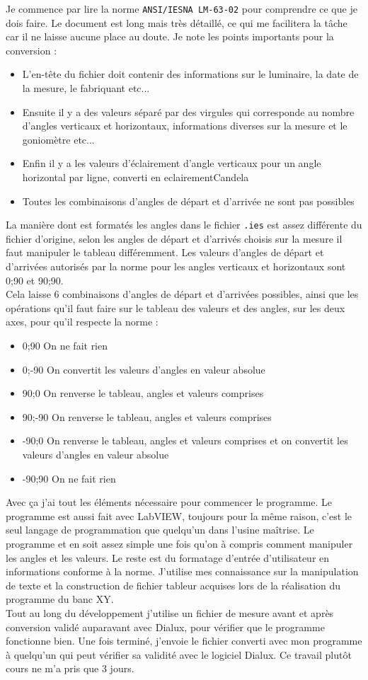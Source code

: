 \documentclass[12pt]{article}
\begin{document}
Je commence par lire la norme \verb|ANSI/IESNA LM-63-02| pour comprendre ce que je dois faire.
Le document est long mais très détaillé, ce qui me facilitera la tâche car il ne laisse aucune place au doute.
Je note les points importants pour la conversion :
\begin{itemize}
	\item L'en-tête du fichier doit contenir des informations sur le luminaire, la date de la mesure, le fabriquant etc...
	\item Ensuite il y a des valeurs séparé par des virgules qui corresponde au nombre d'angles verticaux et horizontaux, informations diverses sur la mesure et le goniomètre etc...
	\item Enfin il y a les valeurs d'éclairement d'angle verticaux pour un angle horizontal par ligne, converti en \gls{eclairementCandela} 
	\item Toutes les combinaisons d'angles de départ et d'arrivée ne sont pas possibles
\end{itemize}
La manière dont est formatés les angles dans le fichier \verb|.ies| est assez différente du fichier d'origine, selon les angles de départ et d'arrivés choisis sur la mesure il faut manipuler le tableau différemment.
Les valeurs d'angles de départ et d'arrivées autorisés par la norme pour les angles verticaux et horizontaux sont 0;90 et 90;90.\\
Cela laisse 6 combinaisons d'angles de départ et d'arrivées possibles, ainsi que les opérations qu'il faut faire sur le tableau des valeurs et des angles, sur les deux axes, pour qu'il respecte la norme :
\begin{itemize}
	\item 0;90 On ne fait rien
	\item 0;-90 On convertit les valeurs d'angles en valeur absolue
	\item 90;0 On renverse le tableau, angles et valeurs comprises
	\item 90;-90 On renverse le tableau, angles et valeurs comprises
	\item -90;0 On renverse le tableau, angles et valeurs comprises et on convertit les valeurs d'angles en valeur absolue
	\item -90;90 On ne fait rien
\end{itemize}


Avec ça j'ai tout les éléments nécessaire pour commencer le programme.
Le programme est aussi fait avec LabVIEW, toujours pour la même raison, c'est le seul langage de programmation que quelqu'un dans l'usine maîtrise.
Le programme et en soit assez simple une fois qu'on à compris comment manipuler les angles et les valeurs.
Le reste est du formatage d'entrée d'utilisateur en informations conforme à la norme.
J'utilise mes connaissance sur la manipulation de texte et la construction de fichier tableur acquises lors de la réalisation du programme du banc XY.\\
Tout au long du développement j'utilise un fichier de mesure avant et après conversion validé auparavant avec Dialux, pour vérifier que le programme fonctionne bien.
Une fois terminé, j'envoie le fichier converti avec mon programme à quelqu'un qui peut vérifier sa validité avec le logiciel Dialux.
Ce travail plutôt cours ne m'a pris que 3 jours.
\end{document}
